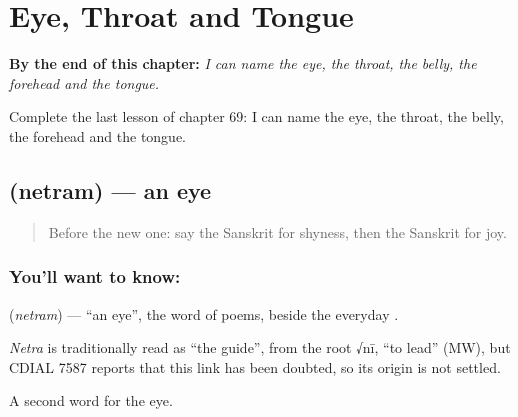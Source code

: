 
\chapter{Eye, Throat and Tongue}
\label{ch:sa-eye-throat-tongue}

\begin{chapteropening}
\textbf{By the end of this chapter:} \emph{I can name the eye, the throat, the belly, the forehead and the tongue.}

Complete the last lesson of chapter 69: I can name the eye, the throat, the belly, the forehead and the tongue.
\end{chapteropening}

\section[\texorpdfstring{\sk{नेत्रम्} (netram)}{नेत्रम् (netram)}]{ (netram) — an eye}

\label{lesson:SA-C69-eye}



\begin{quote}
Before the new one: say the Sanskrit for shyness, then the Sanskrit for joy.
\end{quote}

\subsection*{You'll want to know: }
\textbf{} (\emph{netram}) — \textquotedblleft{}an eye\textquotedblright{}, the word of poems, beside the everyday \textbf{}.

\begin{cousinweb}
\emph{Netra} is traditionally read as \textquotedblleft{}the guide\textquotedblright{}, from the root √nī, \textquotedblleft{}to lead\textquotedblright{} (MW), but CDIAL 7587 reports that this link has been doubted, so its origin is not settled.
\end{cousinweb}

\begin{grammarlens}[title={What you've built}]
A second word for the eye.
\end{grammarlens}

